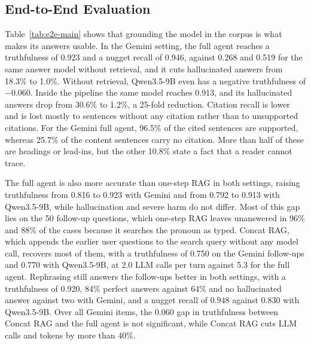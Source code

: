 \subsection{End-to-End Evaluation}\label{sec:results-e2e}



Table~\ref{tab:e2e-main} shows that grounding the model in the corpus is what makes its answers usable. In the Gemini setting, the full agent reaches a truthfulness of 0.923 and a nugget recall of 0.946, against 0.268 and 0.519 for the same answer model without retrieval, and it cuts hallucinated answers from 18.3\% to 1.0\%. Without retrieval, Qwen3.5-9B even has a negative truthfulness of $-0.060$. Inside the pipeline the same model reaches 0.913, and its hallucinated answers drop from 30.6\% to 1.2\%, a 25-fold reduction. Citation recall is lower and is lost mostly to sentences without any citation rather than to unsupported citations. For the Gemini full agent, 96.5\% of the cited sentences are supported, whereas 25.7\% of the content sentences carry no citation. More than half of these are headings or lead-ins, but the other 10.8\% state a fact that a reader cannot trace.

The full agent is also more accurate than one-step RAG in both settings, raising truthfulness from 0.816 to 0.923 with Gemini and from 0.792 to 0.913 with Qwen3.5-9B, while hallucination and severe harm do not differ. Most of this gap lies on the 50 follow-up questions, which one-step RAG leaves unanswered in 96\% and 88\% of the cases because it searches the pronoun as typed. Concat RAG, which appends the earlier user questions to the search query without any model call, recovers most of them, with a truthfulness of 0.750 on the Gemini follow-ups and 0.770 with Qwen3.5-9B, at 2.0 LLM calls per turn against 5.3 for the full agent. Rephrasing still answers the follow-ups better in both settings, with a truthfulness of 0.920, 84\% perfect answers against 64\% and no hallucinated answer against two with Gemini, and a nugget recall of 0.948 against 0.830 with Qwen3.5-9B. Over all Gemini items, the 0.060 gap in truthfulness between Concat RAG and the full agent is not significant, while Concat RAG cuts LLM calls and tokens by more than 40\%.





